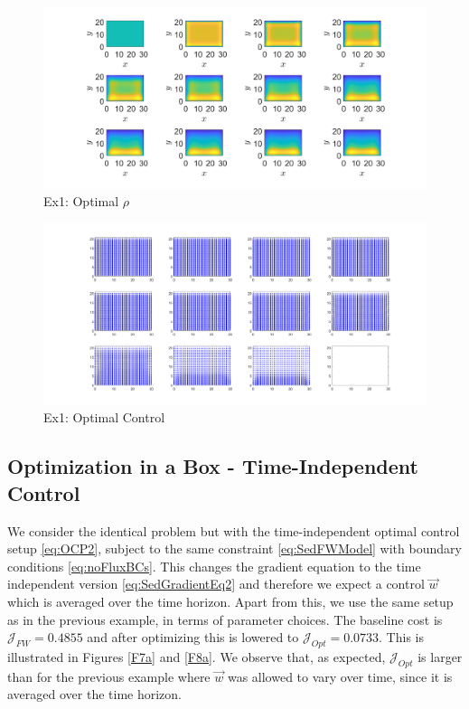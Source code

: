 \documentclass[final]{siamltex}
\newcommand{\w}{\vec{w}}
\begin{document}
\begin{figure}[h]
	\centering
	\includegraphics[scale=0.25]{F21.png}
	\caption{Ex1: Optimal $\rho$} 
	\label{Fa2}
\end{figure}
\begin{figure}[h]
	\centering
	\includegraphics[scale=0.25]{F31.png}
	\caption{Ex1: Optimal Control} 
	\label{Fa3}
\end{figure}



\subsection{Optimization in a Box - Time-Independent Control}
We consider the identical problem but with the time-independent optimal control setup \eqref{eq:OCP2}, subject to the same constraint \eqref{eq:SedFWModel} with boundary conditions \eqref{eq:noFluxBCs}. This changes the gradient equation to the time independent version \eqref{eq:SedGradientEq2} and therefore we expect a control $\w$ which is averaged over the time horizon. Apart from this, we use the same setup as in the previous example, in terms of parameter choices. The baseline cost is $\mathcal J_{FW} = 0.4855$ and after optimizing this is lowered to $\mathcal J_{Opt} = 0.0733$. This is illustrated in Figures \ref{F7a} and \ref{F8a}. We observe that, as expected, $\mathcal J_{Opt}$ is larger than for the previous example where $\w$ was allowed to vary over time, since it is averaged over the time horizon.
	
\end{document}
